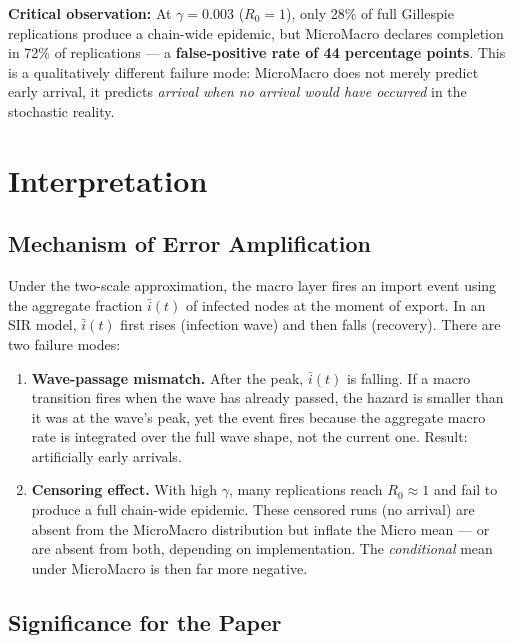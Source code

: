 \documentclass[11pt,a4paper]{article}
\begin{document}
\textbf{Critical observation:} At $\gamma = 0.003$ ($R_0 = 1$), only 28\% of full
Gillespie replications produce a chain-wide epidemic, but MicroMacro
declares completion in 72\% of replications --- a \textbf{false-positive rate
of 44 percentage points}.  This is a qualitatively different failure mode:
MicroMacro does not merely predict early arrival, it predicts \emph{arrival
when no arrival would have occurred} in the stochastic reality.

\section{Interpretation}

\subsection{Mechanism of Error Amplification}

Under the two-scale approximation, the macro layer fires an import event
using the aggregate fraction $\bar{i}(t)$ of infected nodes at the moment
of export.  In an SIR model, $\bar{i}(t)$ first rises (infection wave) and
then falls (recovery).  There are two failure modes:

\begin{enumerate}
  \item \textbf{Wave-passage mismatch.}  After the peak, $\bar{i}(t)$ is
        falling. If a macro transition fires when the wave has already passed,
        the hazard is smaller than it was at the wave's peak, yet the event
        fires because the aggregate macro rate is integrated over the full
        wave shape, not the current one.  Result: artificially early arrivals.

  \item \textbf{Censoring effect.}  With high $\gamma$, many replications
        reach $R_0 \approx 1$ and fail to produce a full chain-wide epidemic.
        These censored runs (no arrival) are absent from the MicroMacro
        distribution but inflate the Micro mean --- or are absent from both,
        depending on implementation.  The \emph{conditional} mean under
        MicroMacro is then far more negative.
\end{enumerate}

\subsection{Significance for the Paper}
\end{document}
